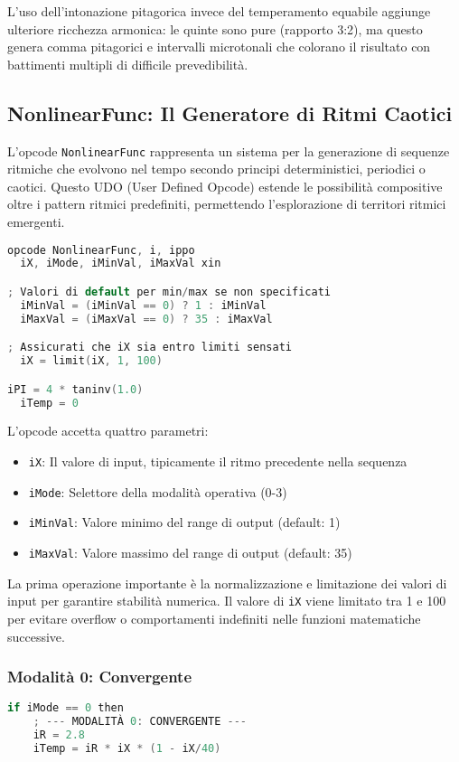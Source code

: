 L'uso dell'intonazione pitagorica invece del temperamento equabile aggiunge ulteriore ricchezza armonica: le quinte sono pure (rapporto 3:2), ma questo genera comma pitagorici e intervalli microtonali che colorano il risultato con battimenti multipli di difficile prevedibilità.
\subsection{NonlinearFunc: Il Generatore di Ritmi Caotici}
L'opcode \texttt{NonlinearFunc} rappresenta un sistema per la generazione di sequenze ritmiche che evolvono nel tempo secondo principi deterministici, periodici o caotici. Questo UDO (User Defined Opcode) estende le possibilità compositive oltre i pattern ritmici predefiniti, permettendo l'esplorazione di territori ritmici emergenti.
\begin{lstlisting}[language=C]
opcode NonlinearFunc, i, ippo
  iX, iMode, iMinVal, iMaxVal xin

; Valori di default per min/max se non specificati
  iMinVal = (iMinVal == 0) ? 1 : iMinVal
  iMaxVal = (iMaxVal == 0) ? 35 : iMaxVal

; Assicurati che iX sia entro limiti sensati
  iX = limit(iX, 1, 100)

iPI = 4 * taninv(1.0)  
  iTemp = 0
\end{lstlisting}

L'opcode accetta quattro parametri:
\begin{itemize}
 \item \texttt{iX}: Il valore di input, tipicamente il ritmo precedente nella sequenza
 \item \texttt{iMode}: Selettore della modalità operativa (0-3)
 \item \texttt{iMinVal}: Valore minimo del range di output (default: 1)
 \item \texttt{iMaxVal}: Valore massimo del range di output (default: 35)
\end{itemize}

La prima operazione importante è la normalizzazione e limitazione dei valori di input per garantire stabilità numerica. Il valore di \texttt{iX} viene limitato tra 1 e 100 per evitare overflow o comportamenti indefiniti nelle funzioni matematiche successive.
\subsubsection{Modalità 0: Convergente}
\begin{lstlisting}[language=C]
if iMode == 0 then
    ; --- MODALITÀ 0: CONVERGENTE ---
    iR = 2.8
    iTemp = iR * iX * (1 - iX/40)
\end{lstlisting}

